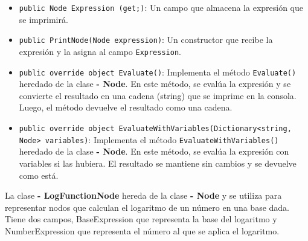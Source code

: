 \documentclass{article}
\newcommand{\subclassed}[1]{\textcolor{classcolor}{\textbf{- #1}}}
\begin{document}
\begin{itemize}
    \item \lstinline{public Node Expression (get;)}: Un campo que almacena la expresión que se imprimirá.

    \item \lstinline{public PrintNode(Node expression)}: Un constructor que recibe la expresión y la asigna al campo \lstinline{Expression}.

    \item \lstinline{public override object Evaluate()}: Implementa el método \lstinline{Evaluate()} heredado de la clase \subclassed{Node}. En este método, se evalúa la expresión y se convierte el resultado en una cadena (string) que se imprime en la consola. Luego, el método devuelve el resultado como una cadena.

    \item \lstinline{public override object EvaluateWithVariables(Dictionary<string, Node> variables)}: Implementa el método \lstinline{EvaluateWithVariables()} heredado de la clase \subclassed{Node}. En este método, se evalúa la expresión con variables si las hubiera. El resultado se mantiene sin cambios y se devuelve como está.
\end{itemize}
La clase \subclassed{LogFunctionNode} hereda de la clase \subclassed{Node} y se utiliza para representar nodos que calculan el logaritmo de un número en una base dada. Tiene dos campos, \textcolor{fieldcolor}{BaseExpression} que representa la base del logaritmo y \textcolor{fieldcolor}{NumberExpression} que representa el número al que se aplica el logaritmo.
\end{document}
